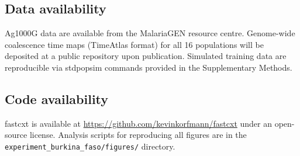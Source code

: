 \documentclass[10pt]{article}
\begin{document}

\subsection*{Data availability}

Ag1000G data are available from the MalariaGEN resource centre.
Genome-wide coalescence time maps (TimeAtlas format) for all 16 populations
will be deposited at a public repository upon publication. Simulated training
data are reproducible via stdpopsim commands provided in the Supplementary
Methods.

\subsection*{Code availability}

fastcxt is available at \url{https://github.com/kevinkorfmann/fastcxt}
under an open-source license. Analysis scripts for reproducing all figures
are in the \texttt{experiment\_burkina\_faso/figures/} directory.




\end{document}
